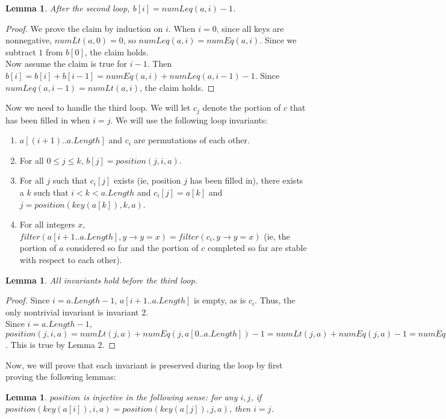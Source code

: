 \documentclass{article}
\newtheorem{lemma}[theorem]{Lemma}
\begin{document}
\begin{lemma}
After the second loop, $b[i] = numLeq(a, i) - 1$.
\end{lemma}
\begin{proof}
We prove the claim by induction on $i$. When $i=0$, since all keys are nonnegative, $numLt(a, 0) = 0$, so $numLeq(a,i) = numEq(a,i)$. Since we subtract $1$ from $b[0]$, the claim holds.
\\Now assume the claim is true for $i-1$. Then $b[i] = b[i] + b[i-1] = numEq(a, i) + numLeq(a, i-1) - 1$. Since $numLeq(a, i-1) = numLt(a, i)$, the claim holds.
\end{proof}
Now we need to handle the third loop. We will let $c_j$ denote the portion of $c$ that has been filled in when $i=j$.  We will use the following loop invariants:
\begin{enumerate}
\item
$a[(i+1)..a.Length]$ and $c_i$ are permutations of each other.
\item
For all $0 \leq j \leq k$, $b[j] = position(j, i, a)$.
\item
For all $j$ such that $c_i[j]$ exists (ie, position $j$ has been filled in), there exists a $k$ such that $i < k < a.Length$ and $c_i[j] = a[k]$ and $j = position(key(a[k]), k, a)$.
\item
For all integers $x$, $filter(a[i+1..a.Length], y \to y = x) = filter(c_i, y \to y = x)$ (ie, the portion of $a$ considered so far and the portion of $c$ completed so far are stable with respect to each other).
\end{enumerate}
\begin{lemma}
All invariants hold before the third loop.
\end{lemma}
\begin{proof}
Since $i= a.Length - 1$, $a[i+1..a.Length]$ is empty, as is $c_i$. Thus, the only nontrivial invariant is invariant 2.
\\Since $i=a.Length - 1$, $position(j, i, a) = numLt(j, a) + numEq(j, a[0..a.Length]) - 1 = numLt(j, a) + numEq(j, a) - 1 = numEq(j,a) - 1$. This is true by Lemma 2.
\end{proof}
Now, we will prove that each invariant is preserved during the loop by first proving the following lemmas:
\begin{lemma}
$position$ is injective in the following sense: for any $i, j$, if $position(key(a[i]), i, a) = position(key(a[j]), j, a)$, then $i = j$.
\end{lemma}	
\end{document}
